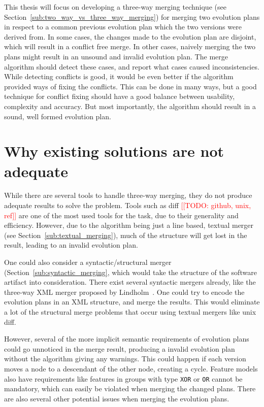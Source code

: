 \documentclass[a4paper,english]{ifimaster}
\newcommand{\todo}[1]{\textcolor{red}{[[TODO: #1]]}\PackageWarning{TODO:}{#1!}}
\begin{document}
This thesis will focus on developing a three-way merging technique (see Section~\ref{sub:two_way_vs_three_way_merging}) for merging two evolution plans in respect to a common previous evolution plan which the two versions were derived from. In some cases, the changes made to the evolution plan are disjoint, which will result in a conflict free merge. In other cases, naively merging the two plans might result in an unsound and invalid evolution plan. The merge algorithm should detect these cases, and report what cases caused inconsistencies. While detecting conflicts is good, it would be even better if the algorithm provided ways of fixing the conflicts. This can be done in many ways, but a good technique for conflict fixing should have a good balance between usability, complexity and accuracy. But most importantly, the algorithm should result in a sound, well formed evolution plan.

\section{Why existing solutions are not adequate}%
\label{sec:why_existing_solutions_are_not_adequate}

While there are several tools to handle three-way merging, they do not produce adequate results to solve the problem. Tools such as diff \todo{github, unix, ref} are one of the most used tools for the task, due to their generality and efficiency. However, due to the algorithm being just a line based, textual merger (see Section~\ref{sub:textual_merging}), much of the structure will get lost in the result, leading to an invalid evolution plan.

One could also consider a syntactic/structural merger (Section~\ref{sub:syntactic_merging}, which would take the structure of the software artifact into consideration. There exist several syntactic mergers already, like the three-way XML merger proposed by Lindholm~\cite{cite:lindholm_xml_merge}. One could try to encode the evolution plans in an XML structure, and merge the results. This would eliminate a lot of the structural merge problems that occur using textual mergers like unix diff. 

However, several of the more implicit semantic requirements of evolution plans could go unnoticed in the merge result, producing a invalid evolution plan without the algorithm giving any warnings. This could happen if each version moves a node to a descendant of the other node, creating a cycle. Feature models also have requirements like features in groups with type \texttt{XOR} or \texttt{OR} cannot be mandatory, which can easily be violated when merging the changed plans. There are also several other potential issues when merging the evolution plans.
\end{document}
